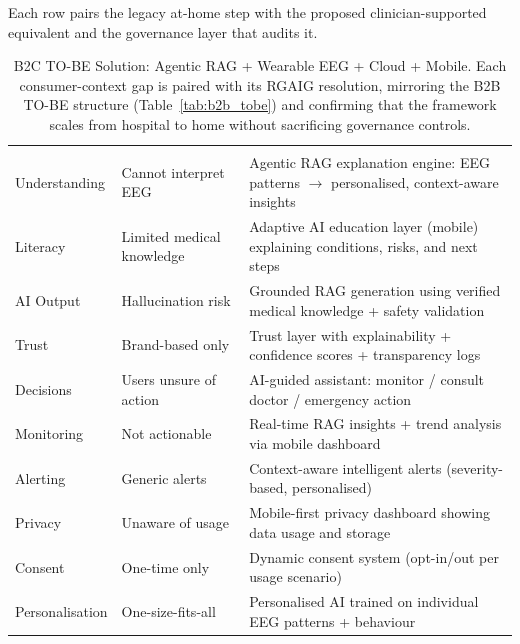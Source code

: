 \noindent Each row pairs the legacy at-home step with the proposed clinician-supported equivalent and the governance layer that audits it.
{\tablestripes\tablefontsize
\begin{xltabular}{\textwidth}{@{} >{\raggedright\arraybackslash}p{3.0cm} >{\raggedright\arraybackslash}p{3.2cm} L @{}}
\caption[B2C TO-BE Solution: Agentic RAG + Wearable EEG + Cloud +]{B2C TO-BE Solution: Agentic RAG + Wearable EEG + Cloud + Mobile. Each consumer-context gap is paired with its RGAIG resolution, mirroring the B2B TO-BE structure (Table~\ref{tab:b2b_tobe}) and confirming that the framework scales from hospital to home without sacrificing governance controls.}\label{tab:b2c_tobe} \\
\toprule
{} &  &  \\
\midrule
\endfirsthead
\toprule
{} &  &  \\
\midrule
\endhead
\bottomrule
\endlastfoot
Understanding & Cannot interpret EEG & Agentic RAG explanation engine: EEG patterns $\to$ personalised, context-aware insights \\
\addlinespace
Literacy & Limited medical knowledge & Adaptive AI education layer (mobile) explaining conditions, risks, and next steps \\
\addlinespace
AI Output & Hallucination risk & Grounded RAG generation using verified medical knowledge + safety validation \\
\addlinespace
Trust & Brand-based only & Trust layer with explainability + confidence scores + transparency logs \\
\addlinespace
Decisions & Users unsure of action & AI-guided assistant: monitor / consult doctor / emergency action \\
\addlinespace
Monitoring & Not actionable & Real-time RAG insights + trend analysis via mobile dashboard \\
\addlinespace
Alerting & Generic alerts & Context-aware intelligent alerts (severity-based, personalised) \\
\addlinespace
Privacy & Unaware of usage & Mobile-first privacy dashboard showing data usage and storage \\
\addlinespace
Consent & One-time only & Dynamic consent system (opt-in/out per usage scenario) \\
\addlinespace
Personalisation & One-size-fits-all & Personalised AI trained on individual EEG patterns + behaviour \\

\end{xltabular}}
